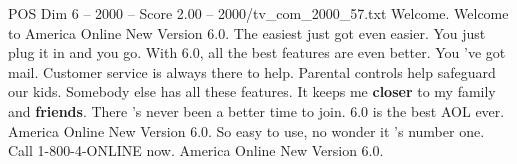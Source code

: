 \begin{textsample}{POS Dim 6 – 2000 – Score 2.00 – 2000/tv\_com\_2000\_57.txt}  \label{ex:f6_pos_081}
Welcome.
Welcome to America Online New Version 6.0.
The easiest just got even easier.
You just plug it in and you go.
With 6.0, all the best features are even better.
You 've got mail.
Customer service is always there to help.
Parental controls help safeguard our kids.
Somebody else has all these features.
It keeps me \textbf{closer} to my family and \textbf{friends}.
There 's never been a better time to join. 6.0 is the best AOL ever.
America Online New Version 6.0.
So easy to use, no wonder it 's number one.
Call 1-800-4-ONLINE now.
America Online New Version 6.0.

\end{textsample}
